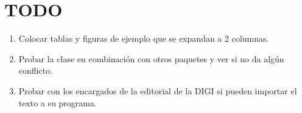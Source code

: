 \documentclass{article}
\begin{document}
\section{TODO}
\begin{enumerate}
\item Colocar tablas y figuras de ejemplo que se expandan a 2 columnas.
\item Probar la clase en combinación con otros paquetes y ver si no da algún conflicto.
\item Probar con los encargados de la editorial de la DIGI si pueden importar el texto a su programa.
\end{enumerate}




 
\end{document}

